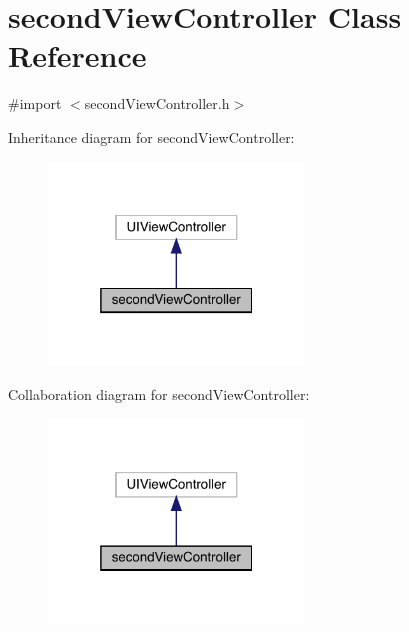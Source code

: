 \hypertarget{interfacesecond_view_controller}{}\section{second\+View\+Controller Class Reference}
\label{interfacesecond_view_controller}


{\ttfamily \#import $<$second\+View\+Controller.\+h$>$}



Inheritance diagram for second\+View\+Controller\+:\nopagebreak
\begin{figure}[H]
\begin{center}
\leavevmode
\includegraphics[width=193pt]{interfacesecond_view_controller__inherit__graph}
\end{center}
\end{figure}


Collaboration diagram for second\+View\+Controller\+:\nopagebreak
\begin{figure}[H]
\begin{center}
\leavevmode
\includegraphics[width=193pt]{interfacesecond_view_controller__coll__graph}
\end{center}
\end{figure}
